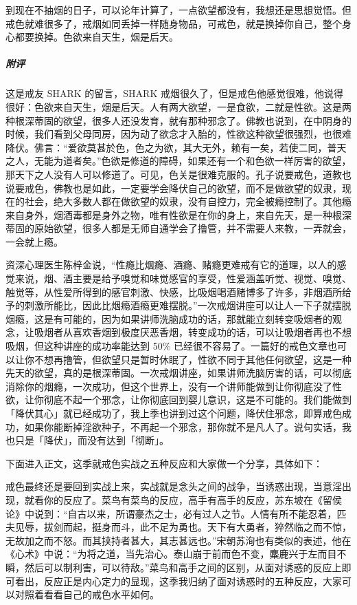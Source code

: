 \begin{case}
    到现在不抽烟的日子，可以论年计算了，一点欲望都没有，我想还是思想觉悟。但戒色就难很多了，戒烟如同丢掉一样随身物品，可戒色，就是换掉你自己，整个身心都要换掉。色欲来自天生，烟是后天。
    \subparagraph{附评} 这是戒友 SHARK 的留言，SHARK 戒烟很久了，但是戒色他感觉很难，他说得很好：色欲来自天生，烟是后天。人有两大欲望，一是食欲，二就是性欲。这是两种根深蒂固的欲望，很多人还没发育，就有那种邪念了。佛教也说到，在中阴身的时候，我们看到父母同房，因为动了欲念才入胎的，性欲这种欲望很强烈，也很难降伏。佛言：“爱欲莫甚於色，色之为欲，其大无外，赖有一矣，若使二同，普天之人，无能为道者矣。”色欲是修道的障碍，如果还有一个和色欲一样厉害的欲望，那天下之人没有人可以修道了。可见，色关是很难克服的。孔子说要戒色，道教也说要戒色，佛教也是如此，一定要学会降伏自己的欲望，而不是做欲望的奴隶，现在的社会，绝大多数人都在做欲望的奴隶，没有自控力，完全被瘾控制了。其他瘾来自身外，烟酒毒都是身外之物，唯有性欲是在你的身上，来自先天，是一种根深蒂固的原始欲望，很多人都是无师自通学会了撸管，并不需要人来教，一弄就会，一会就上瘾。

    资深心理医生陈梓金说，“性瘾比烟瘾、酒瘾、赌瘾更难戒有它的道理，以人的感觉来说，烟、酒主要是给予嗅觉和味觉感官的享受，性爱涵盖听觉、视觉、嗅觉、触觉等，从性爱所得到的感官刺激、快感，比吸烟喝酒赌博多了许多，非烟酒所给予的刺激所能比，因此比烟瘾酒瘾更难摆脱。”一次戒烟讲座可以让人一下子就摆脱烟瘾，这是有可能的，因为如果讲师洗脑成功的话，那就能立刻转变吸烟者的观念，让吸烟者从喜欢香烟到极度厌恶香烟，转变成功的话，可以让吸烟者再也不想吸烟，但这种讲座的成功率能达到 50\% 已经很不容易了。一篇好的戒色文章也可以让你不想再撸管，但欲望只是暂时休眠了，性欲不同于其他任何欲望，这是一种先天的欲望，真的是根深蒂固。一次戒烟讲座，如果讲师洗脑厉害的话，可以彻底消除你的烟瘾，一次成功，但这个世界上，没有一个讲师能做到让你彻底没了性欲，让你彻底不起一个邪念，让你彻底回到婴儿意识，这是不可能的。我们能做到「降伏其心」就已经成功了，我上季也讲到过这个问题，降伏住邪念，即算戒色成功，如果你能断掉淫欲种子，不再起一个邪念，那你就不是凡人了。说句实话，我也只是「降伏」，而没有达到「彻断」。
\end{case}

下面进入正文，这季就戒色实战之五种反应和大家做一个分享，具体如下：

戒色最终还是要回到实战上来，实战就是念头之间的战争，当诱惑出现，当意淫出现，就看你的反应了。菜鸟有菜鸟的反应，高手有高手的反应，苏东坡在《留侯论》中说到：“自古以来，所谓豪杰之士，必有过人之节。人情有所不能忍着，匹夫见辱，拔剑而起，挺身而斗，此不足为勇也。天下有大勇者，猝然临之而不惊，无故加之而不怒。而其挟持者甚大，其志甚远也。”宋朝苏洵也有类似的表述，他在《心术》中说：“为将之道，当先治心。泰山崩于前而色不变，麋鹿兴于左而目不瞬，然后可以制利害，可以待敌。”菜鸟和高手之间的区别，从面对诱惑的反应上即可看出，反应正是内心定力的显现，这季我归纳了面对诱惑时的五种反应，大家可以对照着看看自己的戒色水平如何。

